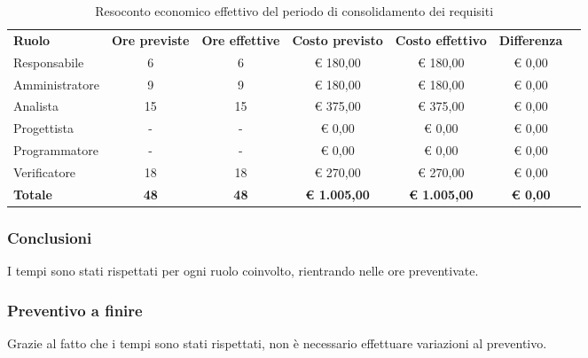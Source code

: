 \documentclass[../piano-di-progetto.tex]{subfiles}
\begin{document}
  \begin{table}[H]
    \centering
    \begin{tabular}{lcccccc}
      \rowcolor{lightgray}
      \textbf{Ruolo}  & \textbf{Ore previste} & \textbf{Ore effettive} & \textbf{Costo previsto} & \textbf{Costo effettivo} & \textbf{Differenza} \\
Responsabile    & 6           & 6           & € 180,00            & € 180,00            & € 0,00          \\
Amministratore  & 9           & 9           & € 180,00            & € 180,00            & € 0,00          \\
Analista        & 15          & 15          & € 375,00            & € 375,00            & € 0,00          \\
Progettista     & -           & -           & € 0,00              & € 0,00              & € 0,00          \\
Programmatore   & -           & -           & € 0,00              & € 0,00              & € 0,00          \\
Verificatore    & 18          & 18          & € 270,00            & € 270,00            & € 0,00          \\
\textbf{Totale} & \textbf{48} & \textbf{48} & \textbf{€ 1.005,00} & \textbf{€ 1.005,00} & \textbf{€ 0,00}
    
    \end{tabular}
    \caption{Resoconto economico effettivo del periodo di consolidamento dei requisiti}
  \end{table}


\subsubsection{Conclusioni}
I tempi sono stati rispettati per ogni ruolo coinvolto, rientrando nelle ore preventivate.

\subsubsection{Preventivo a finire}
Grazie al fatto che i tempi sono stati rispettati, non è necessario effettuare variazioni al preventivo.
\end{document}
